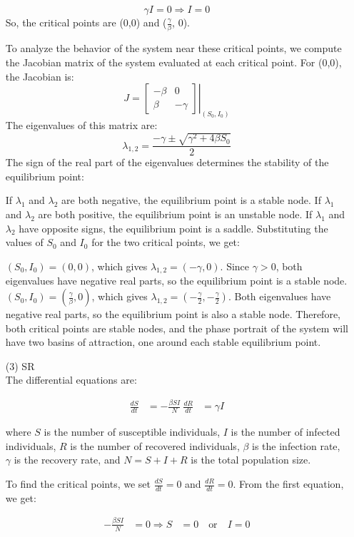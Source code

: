\documentclass{article}
\begin{document}
\begin{enumerate}
$$
\gamma I=0 \Rightarrow I=0
$$
So, the critical points are (0,0) and ($\frac{\gamma}{\beta}$, 0).

To analyze the behavior of the system near these critical points, we compute the Jacobian matrix of the system evaluated at each critical point. For (0,0), the Jacobian is:
$$
J=\left.\left[\begin{array}{cc}
-\beta & 0 \\
\beta & -\gamma
\end{array}\right]\right|_{\left(S_0, I_0\right)}
$$
The eigenvalues of this matrix are:
$$
\lambda_{1,2}=\frac{-\gamma \pm \sqrt{\gamma^2+4 \beta S_0}}{2}
$$
The sign of the real part of the eigenvalues determines the stability of the equilibrium point:

If $\lambda_1$ and $\lambda_2$ are both negative, the equilibrium point is a stable node.
If $\lambda_1$ and $\lambda_2$ are both positive, the equilibrium point is an unstable node.
If $\lambda_1$ and $\lambda_2$ have opposite signs, the equilibrium point is a saddle.
Substituting the values of $S_0$ and $I_0$ for the two critical points, we get:

$(S_0, I_0) = (0,0)$, which gives $\lambda_{1,2} = (-\gamma, 0)$. Since $\gamma > 0$, both eigenvalues have negative real parts, so the equilibrium point is a stable node.
$(S_0, I_0) = (\frac{\gamma}{\beta}, 0)$, which gives $\lambda_{1,2} = (-\frac{\gamma}{2}, -\frac{\gamma}{2})$. Both eigenvalues have negative real parts, so the equilibrium point is also a stable node.
Therefore, both critical points are stable nodes, and the phase portrait of the system will have two basins of attraction, one around each stable equilibrium point. 

\item[(3)] SR \\
The differential equations are:

\begin{align}
\frac{dS}{dt} &= -\frac{\beta S I}{N} \
\frac{dR}{dt} &= \gamma I
\end{align}

where $S$ is the number of susceptible individuals, $I$ is the number of infected individuals, $R$ is the number of recovered individuals, $\beta$ is the infection rate, $\gamma$ is the recovery rate, and $N=S+I+R$ is the total population size.

To find the critical points, we set $\frac{dS}{dt} = 0$ and $\frac{dR}{dt} = 0$. From the first equation, we get:

\begin{align}
-\frac{\beta S I}{N} &= 0
\Rightarrow S &= 0 \quad \text{or} \quad I = 0
\end{align}


\end{enumerate}
\end{document}
